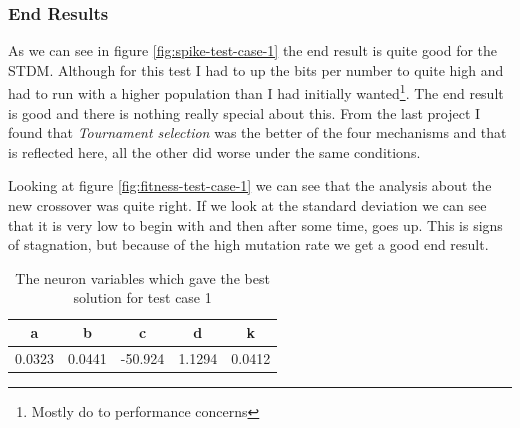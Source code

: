 \subsubsection{End Results}\label{sec:test-case-1-results}
As we can see in figure \ref{fig:spike-test-case-1} the end result is quite good
for the STDM. Although for this test I had to up the bits per number to quite
high and had to run with a higher population than I had initially
wanted\footnote{Mostly do to performance concerns}. The end result is good and
there is nothing really special about this. From the last project I found that
\textit{Tournament selection} was the better of the four mechanisms and that is
reflected here, all the other did worse under the same conditions.

Looking at figure \ref{fig:fitness-test-case-1} we can see that the analysis
about the new crossover was quite right. If we look at the standard deviation we
can see that it is very low to begin with and then after some time, goes up. This
is signs of stagnation, but because of the high mutation rate we get a good end
result.
\begin{table}[h]
	\begin{tabular}{c c c c c}
		a & b & c & d & k \\
		\hline
		0.0323 & 0.0441 & -50.924 & 1.1294 & 0.0412
	\end{tabular}
	\caption{The neuron variables which gave the best solution for test case
	1}
\end{table}
